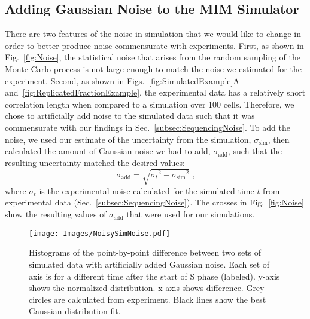 		
		\subsection{Adding Gaussian Noise to the MIM Simulator}
		\label{subsec:AddingNoise}
		
		There are two features of the noise in simulation that we would like to change in order to better produce noise commensurate with experiments.
		First, as shown in Fig.~\ref{fig:Noise}, the statistical noise that arises from the random sampling of the Monte Carlo process is not large enough to match the noise we estimated for the experiment.
		Second, as shown in Figs.~\ref{fig:SimulatedExample}A and~\ref{fig:ReplicatedFractionExample}, the experimental data has a relatively short correlation length when compared to a simulation over 100 cells.
		Therefore, we chose to artificially add noise to the simulated data such that it was commensurate with our findings in Sec.~\ref{subsec:SequencingNoise}.
		To add the noise, we used our estimate of the uncertainty from the simulation, $\sigma_\text{sim}$, then calculated the amount of Gaussian noise we had to add, $\sigma_\text{add}$, such that the resulting uncertainty matched the desired values:
		\begin{equation} \label{eq:AddingNoise}
			\sigma_\text{add} = \sqrt{{\sigma_t}^2 - {\sigma_\text{sim}}^2} \text{ ,}
		\end{equation}
		where $\sigma_t$ is the experimental noise calculated for the simulated time $t$ from experimental data (Sec.~\ref{subsec:SequencingNoise}).
		The crosses in Fig.~\ref{fig:Noise} show the resulting values of $\sigma_\text{add}$ that were used for our simulations.
		
		\begin{figure}[tbh]
			\begin{center}
				\texttt{[image: Images/NoisySimNoise.pdf]}
			\end{center}
				\caption[Estimating Simulation Noise]{\label{fig:NoisySimNoise} Histograms of the point-by-point difference between two sets of simulated data with artificially added Gaussian noise.
					Each set of axis is for a different time after the start of S phase (labeled).
					y-axis shows the normalized distribution.
					x-axis shows difference.
					Grey circles are calculated from experiment.
					Black lines show the best Gaussian distribution fit.
				}
		\end{figure}
		
